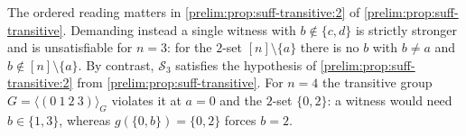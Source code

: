 \begin{remark}
	The ordered reading matters in \cref{prelim:prop:suff-transitive:2} of \cref{prelim:prop:suff-transitive}.
	Demanding instead a single witness with $b \notin \{c,d\}$ is strictly stronger and is
	unsatisfiable for $n = 3$: for the $2$-set $[n] \setminus \{a\}$ there is no $b$ with
	$b \ne a$ and $b \notin [n] \setminus \{a\}$.
	By contrast, $\mathcal S_3$ satisfies the hypothesis of \cref{prelim:prop:suff-transitive:2} from \cref{prelim:prop:suff-transitive}.
	For $n = 4$ the transitive group $G = \langle (0~1~2~3) \rangle_G$ violates it at $a = 0$ and
	the $2$-set $\{0,2\}$: a witness would need $b \in \{1,3\}$, whereas $g(\{0,b\}) = \{0,2\}$
	forces $b = 2$.
\end{remark}

%		
%		
%	
%	

